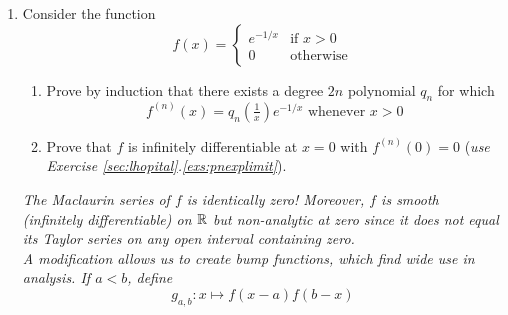 \begin{exercises}
\begin{enumerate}
	 	
	 	\goodbreak
 	
 	
 		\item\label{exs:macnoteq} Consider the function
		\[
			f(x)=
			\begin{cases}
				e^{-1/x}&\text{if }x>0\\
				0&\text{otherwise}
			\end{cases}
		\]
		\begin{enumerate}
		  \item Prove by induction that there exists a degree $2n$ polynomial $q_n$ for which
			\[
				f^{(n)}(x)=q_n\left(\tfrac 1x\right)e^{-1/x}
				\text{ whenever }x>0
			\]
			\item Prove that $f$ is infinitely differentiable at $x=0$ with $f^{(n)}(0)=0$ (\emph{use Exercise \ref*{sec:lhopital}.\ref*{exs:pnexplimit}}).
		\end{enumerate}
		\emph{%
			The Maclaurin series of $f$ is identically zero! Moreover, $f$ is smooth (infinitely differentiable) on $\mathbb{R}$ but non-analytic at zero since it does not equal its Taylor series on any open interval containing zero.\\
			A modification allows us to create \emph{bump functions,} which find wide use in analysis. If $a<b$, define
			\[
				g_{a,b}:x\mapsto f(x-a)f(b-x)
			\]
		}


\end{enumerate}
\end{exercises}
